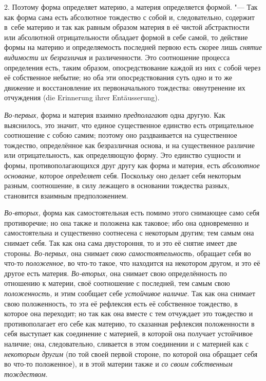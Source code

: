 2. Поэтому форма определяет материю, а материя определяется формой. "--- Так
как форма сама есть абсолютное тождество с собой и, следовательно, содержит
в~себе материю и так как равным образом материя в её чистой абстрактности или
абсолютной отрицательности обладает формой в себе самой, то действие формы на
материю и определяемость последней первою есть скорее лишь
{\em снятие видимости их безразличия} и различенности. Это соотношение процесса
определения есть, таким образом, опосредствование каждой из них с собой через
её собственное небытие; но оба эти опосредствования суть одно и то же движение
и восстановление их первоначального тождества: овнутренение их отчуждения (die
Erinne\-rung ihrer Entäus\-se\-rung).

{\em Во-первых,} форма и материя взаимно {\em предполагают} одна другую. Как
выяснилось, это значит, что единое существенное единство есть отрицательное
соотношение с собою самим; поэтому оно раздваивается на существенное тождество,
определённое как безразличная основа, и на существенное различие или
отрицательность, как определяющую форму. Это единство сущности и формы,
противополагающихся друг другу как форма и материя, есть
{\em абсолютное основание,} которое {\em определяет} себя. Поскольку оно делает
себя некоторым разным, соотношение, в силу лежащего в основании тождества
разных, становится взаимным предположением.

{\em Во-вторых,} форма как самостоятельная есть помимо этого снимающее само
себя противоречие; но она также и положена как таковое; ибо она одновременно и
самостоятельна и существенно соотнесена с некоторым другим; тем самым она
снимает себя. Так как она сама двустороння, то и это её снятие имеет две
стороны. {\em Во-первых,} она снимает {\em свою самостоятельность,} обращает
себя во что-то {\em положенное,} во что-то такое, что находится на некотором
другом, и это её другое есть материя. {\em Во-вторых,} она снимает свою
определённость по отношению к материи, своё соотношение с последней, тем самым
свою {\em положенность,} и этим сообщает себе {\em устойчивое наличие}. Так как
она снимает свою положенность, то эта её рефлексия есть её собственное
тождество, в которое она переходит; но так как она вместе с тем отчуждает это
тождество и противополагает его себе как материю, то сказанная рефлексия
положенности в себя выступает как соединение с материей, в которой она получает
устойчивое наличие; она, следовательно, сливается в этом соединении и с
материей как с {\em некоторым другим} (по той своей первой стороне, по которой
она обращает себя во что-то положенное), и в этой материи также и
{\em со своим собственным тождеством}.

